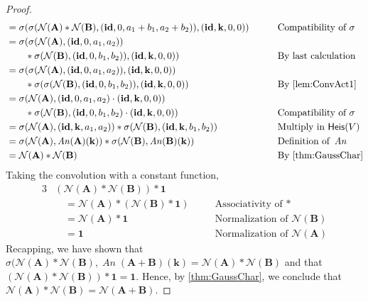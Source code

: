 \documentclass[12pt]{article}
\theoremstyle{definition}
\theoremstyle{plain}
\newcommand{\id}{\mathop{\mathbf{id}}\nolimits}
\newcommand{\An}{\mathop{\mathit{An}}}
\begin{document}
\begin{proof}
\begin{alignat}{3}
        &= \sigma (\sigma (\mathcal{N}(\mathbf{A}) * \mathcal{N}(\mathbf{B}), \left( \id, 0, a_1 + b_1, a_2 + b_2 \right)), (\id, \mathbf{k}, 0, 0)) \qquad &&\text{Compatibility of }\sigma \\
        &= \sigma (\sigma (\mathcal{N}(\mathbf{A}), (\id, 0, a_1, a_2)) \\ &\qquad * \sigma (\mathcal{N}(\mathbf{B}), (\id, 0, b_1, b_2)), (\id, \mathbf{k}, 0, 0)) &&\text{By last calculation}\\
        &= \sigma (\sigma (\mathcal{N}(\mathbf{A}), (\id, 0, a_1, a_2)), (\id, \mathbf{k}, 0, 0)) \\ &\qquad* \sigma (\sigma (\mathcal{N}(\mathbf{B}), (\id, 0, b_1, b_2)), (\id, \mathbf{k}, 0, 0)) \quad &&\text{By \autoref{lem:ConvAct1}} \\ 
        &= \sigma (\mathcal{N}(\mathbf{A}), (\id, 0, a_1, a_2) \cdot (\id, \mathbf{k}, 0, 0)) \\ &\qquad * \sigma (\mathcal{N}(\mathbf{B}), (\id, 0, b_1, b_2) \cdot (\id, \mathbf{k}, 0, 0)) &&\text{Compatibility of }\sigma \nonumber \\
        &= \sigma (\mathcal{N}(\mathbf{A}), (\id, \mathbf{k}, a_1, a_2)) * \sigma (\mathcal{N}(\mathbf{B}), (\id, \mathbf{k}, b_1, b_2)) &&\text{Multiply in }\mathsf{Heis}(V) \\
        &= \sigma (\mathcal{N}(\mathbf{A}), \An (\mathbf{A})(\mathbf{k})) * \sigma (\mathcal{N}(\mathbf{B}), \An (\mathbf{B})(\mathbf{k})) && \text{Definition of }\An \\
        &= \mathcal{N}(\mathbf{A}) * \mathcal{N}(\mathbf{B}) &&\text{By \autoref{thm:GaussChar}}
    \end{alignat}
    Taking the convolution with a constant function, 
    \begin{alignat}{3}
        &(\mathcal{N}(\mathbf{A}) * \mathcal{N}(\mathbf{B})) * \boldsymbol{1} \\
        &\quad = \mathcal{N}(\mathbf{A}) * (\mathcal{N}(\mathbf{B}) * \boldsymbol{1}) \quad && \text{Associativity of }* \\
        &\quad = \mathcal{N}(\mathbf{A}) * \boldsymbol{1} &&\text{Normalization of }\mathcal{N}(\mathbf{B}) \\ 
        &\quad = \boldsymbol{1} &&\text{Normalization of }\mathcal{N}(\mathbf{A})
  \end{alignat}
  Recapping, we have shown that \(\sigma (\mathcal{N}(\mathbf{A}) * \mathcal{N}(\mathbf{B}), \An (\mathbf{A} + \mathbf{B})(\mathbf{k}) = \mathcal{N}(\mathbf{A}) * \mathcal{N}(\mathbf{B})\) and that \((\mathcal{N}(\mathbf{A}) * \mathcal{N}(\mathbf{B})) * \boldsymbol{1} = \boldsymbol{1}\).
  Hence, by \autoref{thm:GaussChar}, we conclude that \(\mathcal{N}(\mathbf{A}) *
  \mathcal{N}(\mathbf{B}) = \mathcal{N}(\mathbf{A} + \mathbf{B})\).
\end{proof}
\end{document}
